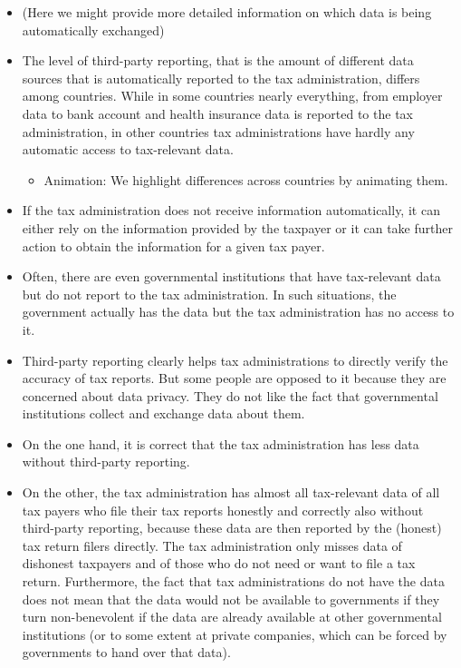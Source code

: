\documentclass[11pt]{article}
\begin{document}
\begin{itemize}
    \item (Here we might provide more detailed information on which data is being automatically exchanged)
    \item The level of third-party reporting, that is the amount of different data sources that is automatically reported to the tax administration, differs among countries. While in some countries nearly everything, from employer data to bank account and health insurance data is reported to the tax administration, in other countries tax administrations have hardly any automatic access to tax-relevant data.
    \begin{itemize}
        \item Animation: We highlight differences across countries by animating them. 
    \end{itemize}
    \item If the tax administration does not receive information automatically, it can either rely on the information provided by the taxpayer or it can take further action to obtain the information for a given tax payer. 
    \item Often, there are even governmental institutions that have tax-relevant data but do not report to the tax administration. In such situations, the government actually has the data but the tax administration has no access to it.
    \item Third-party reporting clearly helps tax administrations to directly verify the accuracy of tax reports. But some people are opposed to it because they are concerned about data privacy. They do not like the fact that governmental institutions collect and exchange data about them.
    \item On the one hand, it is correct that the tax administration has less data without third-party reporting.
    \item On the other, the tax administration has almost all tax-relevant data of all tax payers who file their tax reports honestly and correctly also without third-party reporting, because these data are then reported by the (honest) tax return filers directly. The tax administration only misses data of dishonest taxpayers and of those who do not need or want to file a tax return. Furthermore, the fact that tax administrations do not have the data does not mean that the data would not be available to governments if they turn non-benevolent if the data are already available at other governmental institutions (or to some extent at private companies, which can be forced by governments to hand over that data).
\end{itemize}
\end{document}
